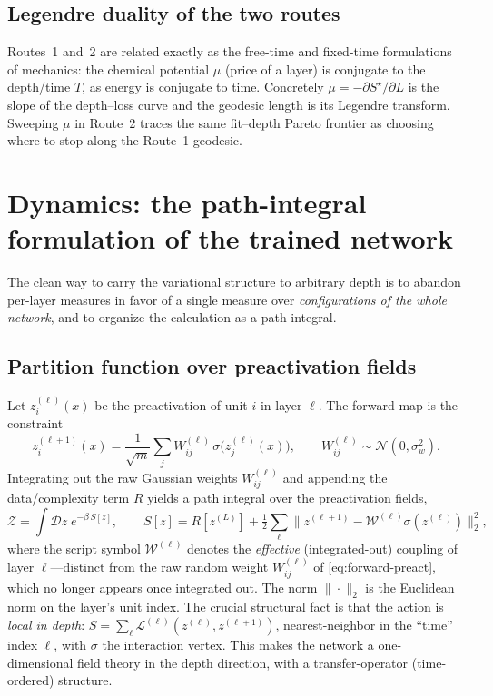 \documentclass[11pt]{article}
\theoremstyle{definition}
\newcommand{\Lcal}{\mathcal{L}}
\newcommand{\Wmet}{\mathcal{W}}
\newcommand{\Dcal}{\mathcal{D}}
\newcommand{\Zpart}{\mathcal{Z}}
\newcommand{\half}{\tfrac{1}{2}}
\begin{document}
\subsection{Legendre duality of the two routes}
\label{sec:duality}

Routes~1 and~2 are related exactly as the free-time and fixed-time formulations of
mechanics: the chemical potential $\mu$ (price of a layer) is conjugate to the depth/time
$T$, as energy is conjugate to time. Concretely $\mu=-\partial S^\star/\partial L$ is the
slope of the depth--loss curve and the geodesic length is its Legendre transform. Sweeping
$\mu$ in Route~2 traces the same fit--depth Pareto frontier as choosing where to stop along
the Route~1 geodesic.


\section{Dynamics: the path-integral formulation of the trained network}
\label{sec:path-integral}

The clean way to carry the variational structure to arbitrary depth is to abandon
per-layer measures in favor of a single measure over \emph{configurations of the whole
network}, and to organize the calculation as a path integral.

\subsection{Partition function over preactivation fields}
\label{sec:partition}

Let $z^{(\ell)}_i(x)$ be the preactivation of unit $i$ in layer $\ell$. The forward map is
the constraint
\begin{equation}
z^{(\ell+1)}_i(x)=\frac{1}{\sqrt m}\sum_j W^{(\ell)}_{ij}\,\sigma\!\big(z^{(\ell)}_j(x)\big),
\qquad W^{(\ell)}_{ij}\sim\mathcal N(0,\sigma_w^2).
\label{eq:forward-preact}
\end{equation}
Integrating out the raw Gaussian weights $W^{(\ell)}_{ij}$ and appending the
data/complexity term $R$ yields a path integral over the preactivation fields,
\begin{equation}
\Zpart=\int\Dcal z\;e^{-\beta\,S[z]},
\qquad
S[z]=R[z^{(L)}]+\half\sum_{\ell}\big\|z^{(\ell+1)}-\Wmet^{(\ell)}\sigma(z^{(\ell)})\big\|_2^2,
\label{eq:action}
\end{equation}
where the script symbol $\Wmet^{(\ell)}$ denotes the \emph{effective} (integrated-out)
coupling of layer $\ell$---distinct from the raw random weight $W^{(\ell)}_{ij}$ of
\eqref{eq:forward-preact}, which no longer appears once integrated out. The norm
$\|\cdot\|_2$ is the Euclidean norm on the layer's unit index. The crucial
structural fact is that the action is \emph{local in depth}:
$S=\sum_\ell \Lcal^{(\ell)}(z^{(\ell)},z^{(\ell+1)})$, nearest-neighbor in the ``time''
index $\ell$, with $\sigma$ the interaction vertex. This makes the network a
one-dimensional field theory in the depth direction, with a transfer-operator
(time-ordered) structure.
\end{document}
